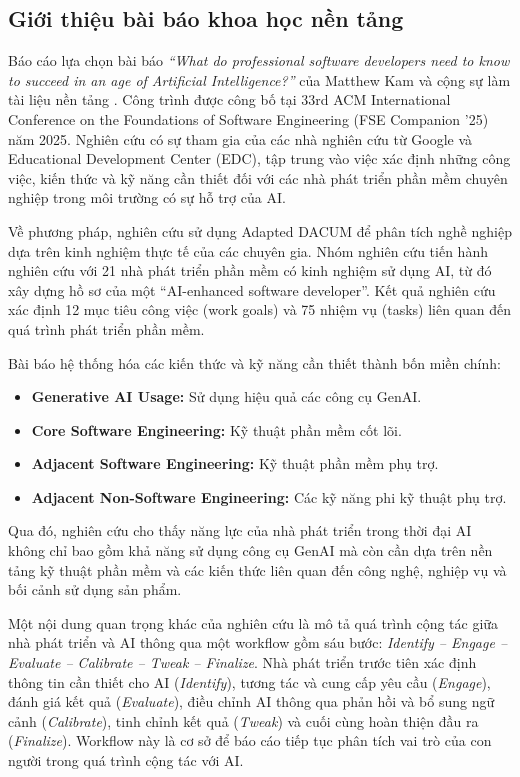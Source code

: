 \subsection{Giới thiệu bài báo khoa học nền tảng}

Báo cáo lựa chọn bài báo \textit{“What do professional software developers need to know to succeed in an age of Artificial Intelligence?”} của Matthew Kam và cộng sự làm tài liệu nền tảng \cite{kam2025what}. Công trình được công bố tại 33rd ACM International Conference on the Foundations of Software Engineering (FSE Companion ’25) năm 2025. Nghiên cứu có sự tham gia của các nhà nghiên cứu từ Google và Educational Development Center (EDC), tập trung vào việc xác định những công việc, kiến thức và kỹ năng cần thiết đối với các nhà phát triển phần mềm chuyên nghiệp trong môi trường có sự hỗ trợ của AI.

Về phương pháp, nghiên cứu sử dụng Adapted DACUM để phân tích nghề nghiệp dựa trên kinh nghiệm thực tế của các chuyên gia. Nhóm nghiên cứu tiến hành nghiên cứu với 21 nhà phát triển phần mềm có kinh nghiệm sử dụng AI, từ đó xây dựng hồ sơ của một “AI-enhanced software developer”. Kết quả nghiên cứu xác định 12 mục tiêu công việc (work goals) và 75 nhiệm vụ (tasks) liên quan đến quá trình phát triển phần mềm.

Bài báo hệ thống hóa các kiến thức và kỹ năng cần thiết thành bốn miền chính:
\begin{itemize}
    \item \textbf{Generative AI Usage:} Sử dụng hiệu quả các công cụ GenAI.
    \item \textbf{Core Software Engineering:} Kỹ thuật phần mềm cốt lõi.
    \item \textbf{Adjacent Software Engineering:} Kỹ thuật phần mềm phụ trợ.
    \item \textbf{Adjacent Non-Software Engineering:} Các kỹ năng phi kỹ thuật phụ trợ.
\end{itemize}

Qua đó, nghiên cứu cho thấy năng lực của nhà phát triển trong thời đại AI không chỉ bao gồm khả năng sử dụng công cụ GenAI mà còn cần dựa trên nền tảng kỹ thuật phần mềm và các kiến thức liên quan đến công nghệ, nghiệp vụ và bối cảnh sử dụng sản phẩm.

Một nội dung quan trọng khác của nghiên cứu là mô tả quá trình cộng tác giữa nhà phát triển và AI thông qua một workflow gồm sáu bước: \textit{Identify -- Engage -- Evaluate -- Calibrate -- Tweak -- Finalize}. Nhà phát triển trước tiên xác định thông tin cần thiết cho AI (\textit{Identify}), tương tác và cung cấp yêu cầu (\textit{Engage}), đánh giá kết quả (\textit{Evaluate}), điều chỉnh AI thông qua phản hồi và bổ sung ngữ cảnh (\textit{Calibrate}), tinh chỉnh kết quả (\textit{Tweak}) và cuối cùng hoàn thiện đầu ra (\textit{Finalize}). Workflow này là cơ sở để báo cáo tiếp tục phân tích vai trò của con người trong quá trình cộng tác với AI.